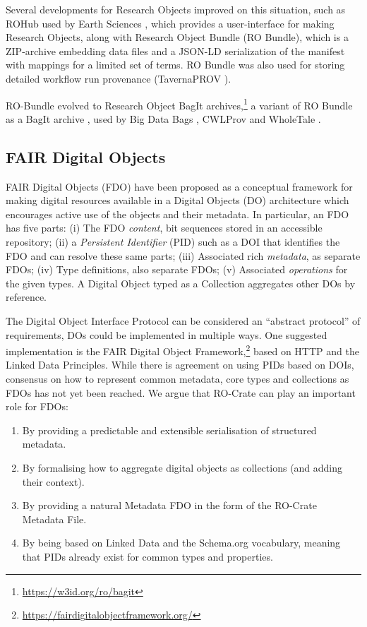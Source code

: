 \documentclass[ds,v1.1.2,openaccess]{iosart2x}%
\begin{document}
Several developments for Research Objects improved on this situation,
such as ROHub used by Earth Sciences
\cite{doi:10.1016/j.future.2019.03.046}, which provides a 
user-interface for making Research Objects, along with Research Object
Bundle \cite{doi:10.5281/zenodo.12586} (RO Bundle), which is a ZIP-archive
embedding data files and a JSON-LD serialization of the manifest with
mappings for a limited set of terms. RO Bundle was also used for
storing detailed workflow run provenance (TavernaPROV
\cite{doi:10.5281/zenodo.51314}).

RO-Bundle evolved to Research Object BagIt
archives,\footnote{\url{https://w3id.org/ro/bagit}} a variant of RO Bundle as a BagIt
archive \cite{doi:10.17487/rfc8493}, used by Big Data Bags
\cite{doi:10.1109/BigData.2016.7840618}, CWLProv
\cite{doi:10.1093/gigascience/giz095} and WholeTale
\cite{doi:10.3233/APC200107,doi:10.1109/eScience.2019.00068}.

\subsection{FAIR Digital Objects}

FAIR Digital Objects (FDO) \cite{doi:10.3390/publications8020021} have been
proposed as a conceptual framework for making digital resources
available in a Digital Objects (DO) architecture which encourages
active use of the objects and their metadata. In particular, an FDO has
five parts: (i) The FDO \textit{content}, bit sequences stored in an
accessible repository; (ii) a \textit{Persistent Identifier} (PID) such as a
DOI that identifies the FDO and can resolve these same parts; (iii)
Associated rich \textit{metadata}, as separate FDOs; (iv) Type definitions,
also separate FDOs; (v) Associated \textit{operations} for the given types. A
Digital Object typed as a Collection aggregates other DOs by reference.

The Digital Object Interface Protocol \cite{doip2.0} can be considered an
``abstract protocol'' of requirements, DOs could be implemented in
multiple ways. One suggested implementation is the FAIR Digital Object
Framework,\footnote{\url{https://fairdigitalobjectframework.org/}} based on HTTP and
the Linked Data Principles. While there is agreement on using PIDs
based on DOIs, consensus on how to represent common metadata, core
types and collections as FDOs has not yet been reached. We argue that
RO-Crate can play an important role for FDOs:
\begin{enumerate}
\item[1.] By providing a predictable and extensible serialisation of
structured metadata.
\item[2.] By formalising how to aggregate digital objects as collections (and
adding their context).
\item[3.] By providing a natural Metadata FDO in the form of the RO-Crate
Metadata File.
\item[4.] By being based on Linked Data and the Schema.org vocabulary, meaning
that PIDs already exist for common types and properties.
\end{enumerate}
\end{document}
